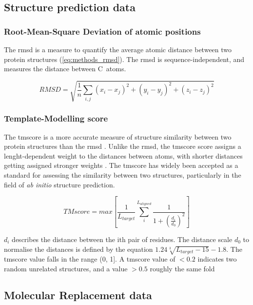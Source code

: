 \subsection{Structure prediction data}
\subsubsection{Root-Mean-Square Deviation of atomic positions}
The \gls{rmsd} is a measure to quantify the average atomic distance between two protein structures (\cref{eq:methods_rmsd}). The \gls{rmsd} is sequence-independent, and measures the distance between C\textalpha\ atoms.

\begin{equation}
    RMSD=\sqrt{\frac{1}{n}\sum_{i,j}{(x_i-x_j)^2+(y_i-y_j)^2+(z_i-z_j)^2}}
    \label{eq:methods_rmsd}
\end{equation}

\subsubsection{Template-Modelling score}
The \gls{tmscore} is a more accurate measure of structure similarity between two protein structures than the \gls{rmsd} \cite{Zhang2004-ha}. Unlike the \gls{rmsd}, the \gls{tmscore} score assigns a lenght-dependent weight to the distances between atoms, with shorter distances getting assigned stronger weights \cite{Zhang2004-ha}. The \gls{tmscore} has widely been accepted as a standard for assessing the similarity between two structures, particularly in the field of \textit{ab initio} structure prediction.

\begin{equation}
    TMscore=max\left[\frac{1}{L_{target}}\sum_{i}^{L_{aligned}}{\frac{1}{1+\left(\frac{d_i}{d_0}\right)^2}}\right]
    \label{eq:methods_tmscore}
\end{equation}

$d_i$ describes the distance between the ith pair of residues. The distance scale $d_0$ to normalise the distances is defined by the equation $1.24\sqrt[3]{L_{target}-15}-1.8$. The \gls{tmscore} value falls in the range (0, 1]. A \gls{tmscore} value of $<0.2$ indicates two random unrelated structures, and a value $>0.5$ roughly the same fold \cite{Xu2010-kr}

\subsection{Molecular Replacement data}

